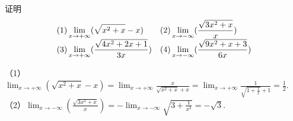 \begin{example}{证明}{}
       \vspace{-5pt}\[\begin{array}{l@{\quad}l}
    (1)\displaystyle\lim_{x\rightarrow +\infty}(\sqrt{x^2+x}-x)&
    (2)\displaystyle\lim_{x\rightarrow -\infty}(\frac{\sqrt{3x^2+x}}{x})\\
    (3)\displaystyle\lim_{x\rightarrow +\infty}(\frac{\sqrt{4x^2+2x+1}}{3x})&
    (4)\displaystyle\lim_{x\rightarrow -\infty}(\frac{\sqrt{9x^2+x+3}}{6x})\\
       \end{array}\]
\end{example}
\begin{solution}
    （1）$\displaystyle\lim_{x\rightarrow +\infty}(\sqrt{x^2+x}-x)=\lim_{x\rightarrow +\infty}\frac{x}{\sqrt{x^2+x}+x}=\lim_{x\rightarrow +\infty}\frac{1}{\sqrt{1+\frac{1}{x}}+1}=\frac12$.\\
    （2）$\displaystyle\lim_{x\rightarrow -\infty}(\frac{\sqrt{3x^2+x}}{x})=-\lim_{x\rightarrow -\infty}\sqrt{3+\frac{1}{x^2}}=-\sqrt3$.\\
\end{solution}